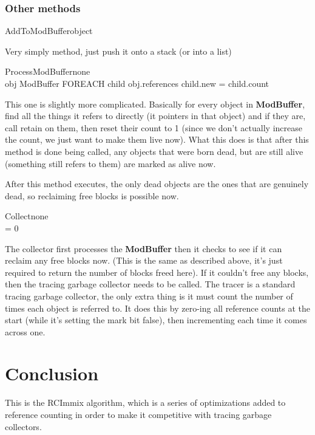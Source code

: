 \documentclass{article}
\begin{document}
\subsubsection{Other methods}

\begin{pseudocode}{AddToModBuffer}{object}
	\\
\end{pseudocode}

Very simply method, just push it onto a stack (or into a list)

\begin{pseudocode}{ProcessModBuffer}{none}
	\\
	\FOREACH obj \in ModBuffer \DO
	\BEGIN
		FOREACH child \in obj.references \DO
		\BEGIN
			\IF child.new = \TRUE \THEN 
			\BEGIN
				child.count 
			\END
		\END
	\END
\end{pseudocode}

This one is slightly more complicated. Basically for every object in \textbf{ModBuffer}, find all the things it refers to directly (it pointers in that object) and if they are, call retain on them, then reset their count to 1 (since we don't actually increase the count, we just want to make them live now). What this does is that after this method is done being called, any objects that were born dead, but are still alive (something still refers to them) are marked as alive now. 

After this method executes, the only dead objects are the ones that are genuinely dead, so reclaiming free blocks is possible now.

\begin{pseudocode}{Collect}{none}
	\\
	\IF {} = 0 \THEN
\end{pseudocode}

The collector first processes the \textbf{ModBuffer} then it checks to see if it can reclaim any free blocks now. (This is the same  as described above, it's just required to return the number of blocks freed here). If it couldn't free any blocks, then the tracing garbage collector needs to be called. The tracer is a standard tracing garbage collector, the only extra thing is it must count the number of times each object is referred to. It does this by zero-ing all reference counts at the start (while it's setting the mark bit false), then incrementing each time it comes across one.

\section{Conclusion}

This is the RCImmix algorithm, which is a series of optimizations added to reference counting in order to make it competitive with tracing garbage collectors.



\end{document}

